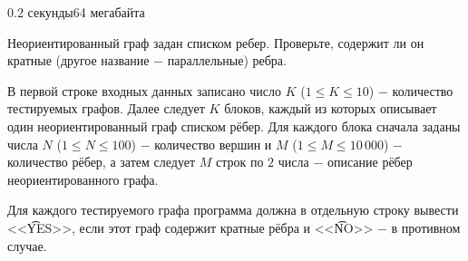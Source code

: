 \begin{problem}{}{}{}{0.2 секунды}{64 мегабайта}

Неориентированный граф задан списком ребер. Проверьте, содержит ли он кратные (другое название $-$ параллельные) ребра.

\InputFile
В первой строке входных данных записано число $K$ ($1 \le K \le 10$) $-$ количество тестируемых графов. 
Далее следует $K$ блоков, каждый из которых описывает один неориентированный граф списком рёбер. 
Для каждого блока сначала заданы числа $N$ ($1 \le N \le 100$) $-$ количество вершин и $M$ ($1 \le M \le 10\,000$) $-$
количество рёбер, а затем следует $M$ строк по $2$ числа $-$ описание рёбер неориентированного графа.

\OutputFile
Для каждого тестируемого графа программа должна в отдельную строку вывести <<{\t{YES}}>>, если этот граф
содержит кратные рёбра и <<{\t{NO}}>> $-$ в противном случае.

\Example

\begin{example}
%
\end{example}

\end{problem}

